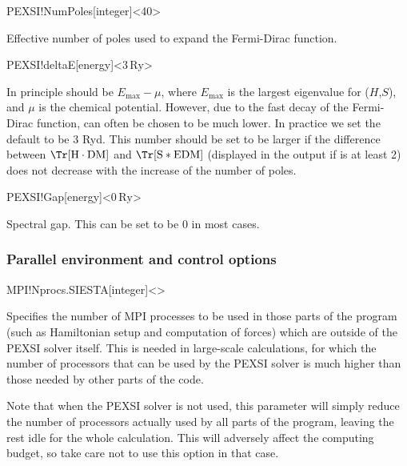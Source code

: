 \begin{fdfentry}{PEXSI!NumPoles}[integer]<40>

  Effective number of poles used to expand the Fermi-Dirac function.
  
\end{fdfentry}

\begin{fdfentry}{PEXSI!deltaE}[energy]<$3\,\mathrm{Ry}$>
  
  In principle  should be $E_{\max}-\mu$, where
  $E_{\max}$ is the largest eigenvalue for ($H$,$S$), and $\mu$ is the
  chemical potential. However, due to the fast decay of the
  Fermi-Dirac function,  can often be chosen to be
  much lower.  In practice we set the default to be 3 Ryd.  This
  number should be set to be larger if the difference between
  $\Tr[\mathrm H\cdot\mathrm{DM}]$ and $\Tr[\mathrm S*\mathrm{EDM}]$
  (displayed in the output if  is at least 2)
  does not decrease with the increase of the number of poles.

\end{fdfentry}


\begin{fdfentry}{PEXSI!Gap}[energy]<$0\,\mathrm{Ry}$>

  Spectral gap. This can be set to be 0 in most cases.

\end{fdfentry}


\subsubsection{Parallel environment and control options}

\begin{fdfentry}{MPI!Nprocs.SIESTA}[integer]<>

  Specifies the number of MPI processes to be used in those parts of
  the program (such as Hamiltonian setup and computation of forces)
  which are outside of the PEXSI solver itself. This is needed in
  large-scale calculations, for which the number of processors that
  can be used by the PEXSI solver is much higher than those needed by
  other parts of the code.
  
  Note that when the PEXSI solver is not used, this parameter will
  simply reduce the number of processors actually used by all parts of
  the program, leaving the rest idle for the whole calculation. This
  will adversely affect the computing budget, so take care not to use
  this option in that case.
  
\end{fdfentry}

